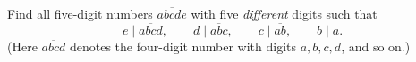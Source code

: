 Find all five-digit numbers $\overline{abcde}$ with five \emph{different} digits such that
\[
e\mid\overline{abcd},\qquad d\mid\overline{abc},\qquad c\mid\overline{ab},\qquad b\mid a .
\]
(Here $\overline{abcd}$ denotes the four-digit number with digits $a,b,c,d$, and so on.)
